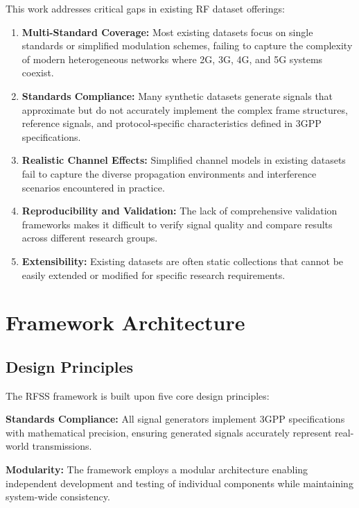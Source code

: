 \documentclass[twocolumn,10pt]{article}
\begin{document}
This work addresses critical gaps in existing RF dataset offerings:

\begin{enumerate}
\item \textbf{Multi-Standard Coverage:} Most existing datasets focus on single standards or simplified modulation schemes, failing to capture the complexity of modern heterogeneous networks where 2G, 3G, 4G, and 5G systems coexist.

\item \textbf{Standards Compliance:} Many synthetic datasets generate signals that approximate but do not accurately implement the complex frame structures, reference signals, and protocol-specific characteristics defined in 3GPP specifications.

\item \textbf{Realistic Channel Effects:} Simplified channel models in existing datasets fail to capture the diverse propagation environments and interference scenarios encountered in practice.

\item \textbf{Reproducibility and Validation:} The lack of comprehensive validation frameworks makes it difficult to verify signal quality and compare results across different research groups.

\item \textbf{Extensibility:} Existing datasets are often static collections that cannot be easily extended or modified for specific research requirements.
\end{enumerate}

\section{Framework Architecture}

\subsection{Design Principles}

The RFSS framework is built upon five core design principles:

\textbf{Standards Compliance:} All signal generators implement 3GPP specifications with mathematical precision, ensuring generated signals accurately represent real-world transmissions.

\textbf{Modularity:} The framework employs a modular architecture enabling independent development and testing of individual components while maintaining system-wide consistency.
\end{document}
